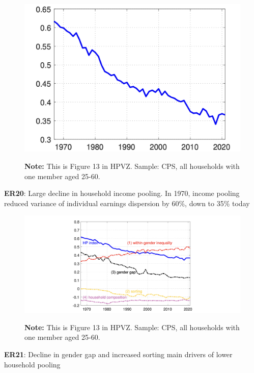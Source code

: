 \documentclass[11pt, aspectratio=169]{beamer}
\begin{document}
\begin{frame}{}
	\begin{figure}
		\includegraphics[scale=0.4]{./figures/inequality_household_2}
	\vspace*{-2mm}
	\begin{flushleft}
		{\scriptsize \hspace{6mm} \textbf{Note:} This is Figure 13 in HPVZ. Sample: CPS, all households with one member aged 25-60.}
	\end{flushleft}	
	\end{figure}

	\vspace{0mm}
	{\color{blue}\textbf{ER20}}: Large decline in household income pooling. In 1970, income pooling reduced variance of individual earnings dispersion by 60\%, down to 35\% today
\end{frame}


\begin{frame}{}
	\begin{figure}
		\includegraphics[scale=0.35]{./figures/inequality_household_3}
	\vspace*{-2mm}
	\begin{flushleft}
		{\scriptsize \hspace{6mm} \textbf{Note:} This is Figure 13 in HPVZ. Sample: CPS, all households with one member aged 25-60.}
	\end{flushleft}	
	\end{figure}

	\vspace{0mm}
	{\color{blue}\textbf{ER21}}: Decline in gender gap and increased sorting main drivers of lower household pooling
\end{frame}
\end{document}
